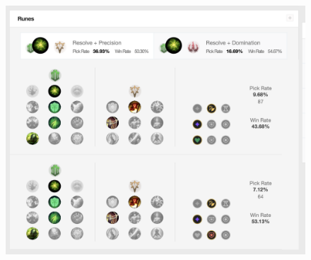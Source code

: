\documentclass[10pt,landscape,a4paper,twocolumn]{article}
\begin{document}
\begin{figure}[ht]
\includegraphics[scale=0.3]{3}
\end{figure}
\end{document}
